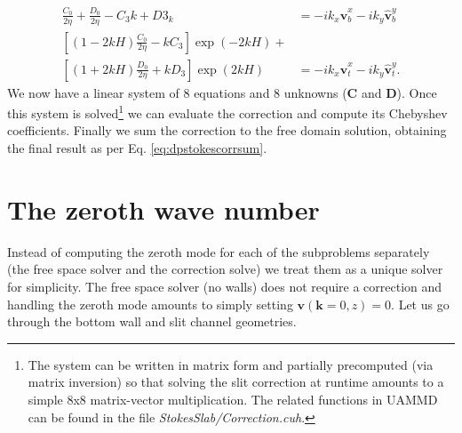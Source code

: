\documentclass[twoside,openright,titlepage,numbers=noenddot,%
headinclude,footinclude,cleardoublepage=empty,abstract=on,
BCOR=5mm,fontsize=11pt, dvipsnames, paper=b5
]{scrreprt}
\renewcommand{\vec}[1]{\bm{#1}}
\newcommand{\uammd}{\gls{UAMMD}\xspace}
\newcommand{\fou}[1]{\widehat{#1}}
\newcommand{\fvel}{v}
\begin{document}
\begin{equation}
  \begin{aligned}
    \frac{C_0}{2\eta} + \frac{D_0}{2\eta} - C_3k + D3_k &= -ik_x\fou{\vec{\fvel}}_b^x - ik_y\fou{\vec{\fvel}}_b^y\\
    \left[(1-2kH)\frac{C_0}{2\eta}-kC_3\right]\exp(-2kH) +&\\ \left[(1+2kH)\frac{D_0}{2\eta} + kD_3\right]\exp(2kH) &= -ik_x\fou{\vec{\fvel}}_t^x - ik_y\fou{\vec{\fvel}}_t^y.
\end{aligned}
\end{equation}
We now have a linear system of 8 equations and 8 unknowns ($\vec{C}$ and $\vec{D}$). Once this system is solved\footnote{The system can be written in matrix form and partially precomputed (via matrix inversion) so that solving the slit correction at runtime amounts to a simple 8x8 matrix-vector multiplication. The related functions in \uammd can be found in the file \emph{StokesSlab/Correction.cuh}.} we can evaluate the correction and compute its Chebyshev coefficients. Finally we sum the correction to the free domain solution, obtaining the final result as per Eq. \eqref{eq:dpstokescorrsum}.

\section{The zeroth wave number}
Instead of computing the zeroth mode for each of the subproblems separately (the free space solver and the correction solve) we treat them as a unique solver for simplicity. The free space solver (no walls) does not require a correction and handling the zeroth mode amounts to simply setting $\vec{\fvel}(\vec{k}=0,z) = 0$. Let us go through the bottom wall and slit channel geometries.
\end{document}
